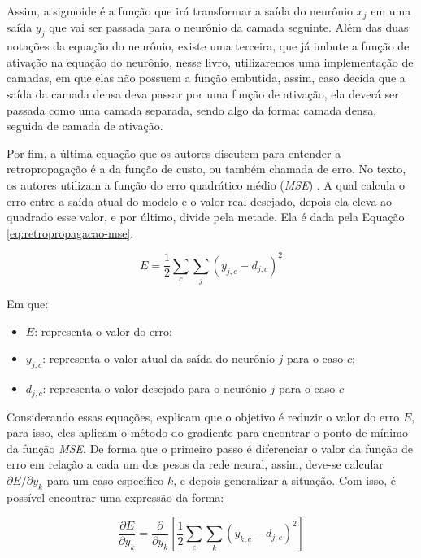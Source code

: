 Assim, a sigmoide é a função que irá transformar a saída do neurônio $x_j$ em uma saída $y_j$ que vai ser passada para o neurônio da camada seguinte. Além das duas notações da equação do neurônio, existe uma terceira, que já imbute a função de ativação na equação do neurônio, nesse livro, utilizaremos uma implementação de camadas, em que elas não possuem a função embutida, assim, caso decida que a saída da camada densa deva passar por uma função de ativação, ela deverá ser passada como uma camada separada, sendo algo da forma: camada densa, seguida de camada de ativação.

Por fim, a última equação que os autores discutem para entender a retropropagação é a da função de custo, ou também chamada de erro. No texto, os autores utilizam a função do erro quadrático médio (\textit{MSE}) \parencite{BackpropagationArticle}. A qual calcula o erro entre a saída atual do modelo e o valor real desejado, depois ela eleva ao quadrado esse valor, e por último, divide pela metade. Ela é dada pela Equação \ref{eq:retropropagacao-mse}.

\begin{equation}
    E = \frac{1}{2} \sum_{c} \sum_{j} (y_{j, c} - d_{j, c})^2 
    \label{eq:retropropagacao-mse}
\end{equation}

Em que:

\begin{itemize}
    \item $E$: representa o valor do erro;
    \item $y_{j, c}$: representa o valor atual da saída do neurônio $j$ para o caso $c$;
    \item $d_{j, c}$: representa o valor desejado para o neurônio $j$ para o caso $c$
\end{itemize}

Considerando essas equações, \textcite{BackpropagationArticle} explicam que o objetivo é reduzir o valor do erro $E$, para isso, eles aplicam o método do gradiente para encontrar o ponto de mínimo da função \textit{MSE}. De forma que o primeiro passo é diferenciar o valor da função de erro em relação a cada um dos pesos da rede neural, assim, deve-se calcular $\partial E / \partial y_k$ para um caso específico $k$, e depois generalizar a situação. Com isso, é possível encontrar uma expressão da forma:

\[
    \frac{\partial E}{\partial y_k} = \frac{\partial}{\partial y_k} \left[ \frac{1}{2} \sum_c \sum_k (y_{k, c} - d_{j, c})^2\right]
\]

